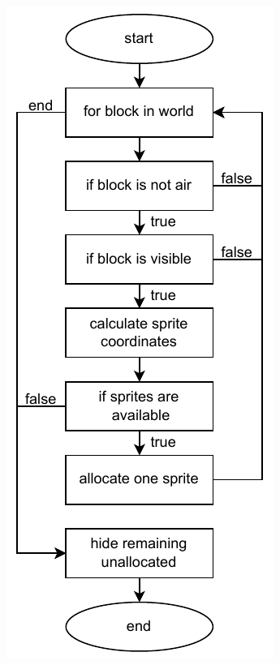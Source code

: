 \documentclass[12pt,a4paper]{article}
\begin{document}
\begin{center}
\begin{minipage}{0.4\textwidth}
\centering
{}
\includegraphics[scale=0.8]{schema3.pdf}
\label{fig:image1}
\end{minipage}
\hfill
\begin{minipage}{0.4\textwidth}
\centering
{}

\end{minipage}
\end{center}
\end{document}

